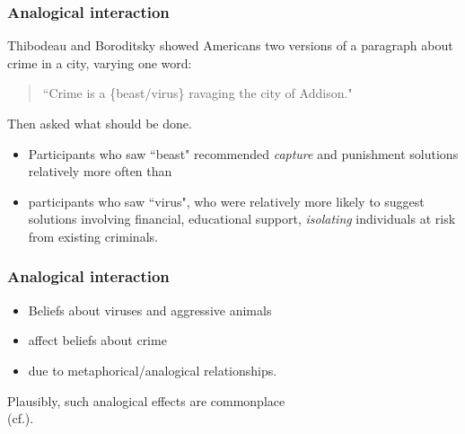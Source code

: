 \documentclass[12pt,xcolor=svgnames]{beamer}
\makeatletter
\newcommand{\cf}{cf.\@\xspace}
\let\olditem\item
\renewcommand{\item}{%
\olditem\vspace{0.5pt}}
\makeatother
\begin{document}
\begin{frame}\frametitle{Analogical interaction}
Thibodeau and Boroditsky
\citeyearpar{ThibodeauBoroditsky:MetaphorsThinkWith,
ThibodeauBoroditsky:MetaphorsInfluenceReasoning}
showed Americans two versions of a paragraph about crime in a city,
varying one word:
\begin{quote}
{\small ``Crime is a \{beast/virus\} ravaging the city of Addison."}
\end{quote}
Then asked what should be done.
\begin{itemize}
\item Participants who saw ``beast" recommended {\em capture\/} and
    punishment solutions relatively more often than 
\item participants who saw ``virus", who were relatively more
likely to suggest solutions involving financial, educational
support, {\em isolating\/} individuals at risk from existing criminals.
\end{itemize}
%
\end{frame}

\begin{frame}\frametitle{Analogical interaction}
\begin{itemize}
\item Beliefs about viruses and aggressive animals
\item affect beliefs about crime
\item due to metaphorical/analogical relationships.
\end{itemize}
\vspace{3ex}
Plausibly, such analogical effects are commonplace \\
{\scriptsize (\cf \citealt{HofstadterSander:SurfacesEssences,
Lakoff:MoralPolitics, GentnerEtAl:MetaphorLikeAnalogy})}.
\end{frame}
\end{document}
